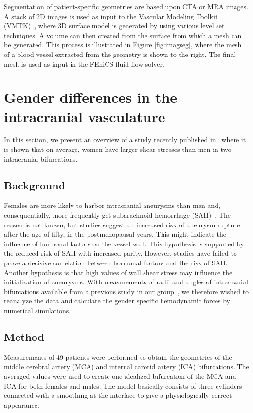 Segmentation of patient-specific geometries are based upon CTA or MRA
images. A stack of 2D images is used as input to the Vascular Modeling
Toolkit (VMTK)~\cite{vmtk}, where 3D surface model is generated by using
various level set techniques. A volume can then created from the surface from
which a mesh can be generated. This process is illustrated in Figure
\ref{fig:imagseg}, where the mesh of a blood vessel extracted from the
geometry is shown to the right. The final mesh is used as input in the
FEniCS fluid flow solver.

\section{Gender differences in the intracranial vasculature} \label{gender}

In this section, we present an overview of a study recently published
in~\cite{kvs-sex} where it is shown that on average, women have larger
shear stresses than men in two intracranial bifurcations.

\subsection{Background}

Females are more likely to harbor intracranial aneurysms than men and,
consequentially, more frequently get subarachnoid hemorrhage
(SAH)~\cite{humphrey,eden}. The reason is not known, but studies
suggest an increased risk of aneurysm rupture after the age of fifty,
in the postmenopausal years. This might indicate the influence of
hormonal factors on the vessel wall. This hypothesis is supported by
the reduced risk of SAH with increased parity. However, studies have
failed to prove a decisive correlation between hormonal factors and
the risk of SAH. Another hypothesis is that high values of wall shear
stress may influence the initialization of aneurysms. With
measurements of radii and angles of intracranial bifurcations
available from a previous study in our group~\cite{tor}, we therefore
wished to reanalyze the data and calculate the gender specific
hemodynamic forces by numerical simulations.

\subsection{Method}

Measurements of 49 patients were performed to obtain the geometries of
the middle cerebral artery (MCA) and internal carotid artery (ICA)
bifurcations. The averaged values were used to create one idealized
bifurcation of the MCA and ICA for both females and males. The model
basically consists of three cylinders connected with a smoothing at
the interface to give a physiologically correct appearance.

